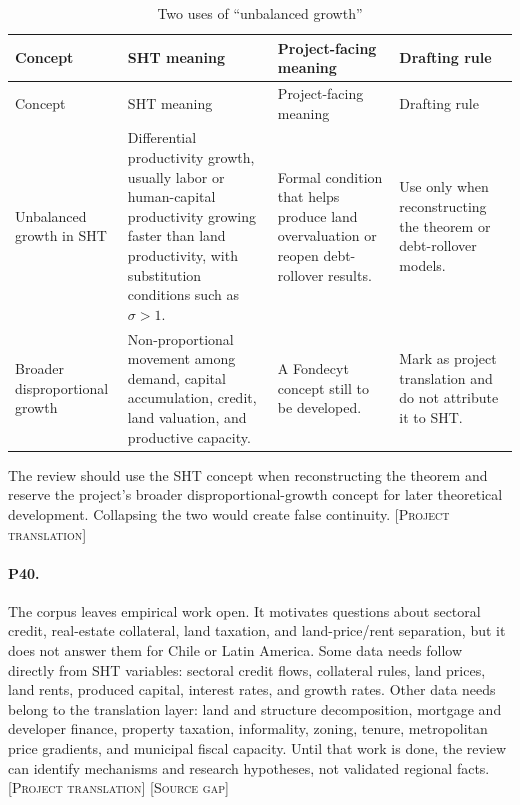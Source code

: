 \documentclass[11pt]{article}
\newcommand{\projecttranslation}{\textsc{[Project translation]}}
\newcommand{\sourcegap}{\textsc{[Source gap]}}
\begin{document}
\begin{center}
\small
\begin{longtable}{p{}p{}p{}p{}}
\caption{Two uses of ``unbalanced growth''}\label{tab:unbalanced-growth-uses}\\
\toprule
Concept & SHT meaning & Project-facing meaning & Drafting rule\\
\midrule
\endfirsthead
\toprule
Concept & SHT meaning & Project-facing meaning & Drafting rule\\
\midrule
\endhead
Unbalanced growth in SHT & Differential productivity growth, usually labor or human-capital productivity growing faster than land productivity, with substitution conditions such as \(\sigma>1\). & Formal condition that helps produce land overvaluation or reopen debt-rollover results. & Use only when reconstructing the theorem or debt-rollover models.\\
Broader disproportional growth & Non-proportional movement among demand, capital accumulation, credit, land valuation, and productive capacity. & A Fondecyt concept still to be developed. & Mark as project translation and do not attribute it to SHT.\\
\bottomrule
\end{longtable}
\end{center}

The review should use the SHT concept when reconstructing the theorem and reserve the project's broader disproportional-growth concept for later theoretical development. Collapsing the two would create false continuity. \projecttranslation{}

\paragraph{P40.} The corpus leaves empirical work open. It motivates questions about sectoral credit, real-estate collateral, land taxation, and land-price/rent separation, but it does not answer them for Chile or Latin America. Some data needs follow directly from SHT variables: sectoral credit flows, collateral rules, land prices, land rents, produced capital, interest rates, and growth rates. Other data needs belong to the translation layer: land and structure decomposition, mortgage and developer finance, property taxation, informality, zoning, tenure, metropolitan price gradients, and municipal fiscal capacity. Until that work is done, the review can identify mechanisms and research hypotheses, not validated regional facts. \projecttranslation{} \sourcegap{}
\end{document}
